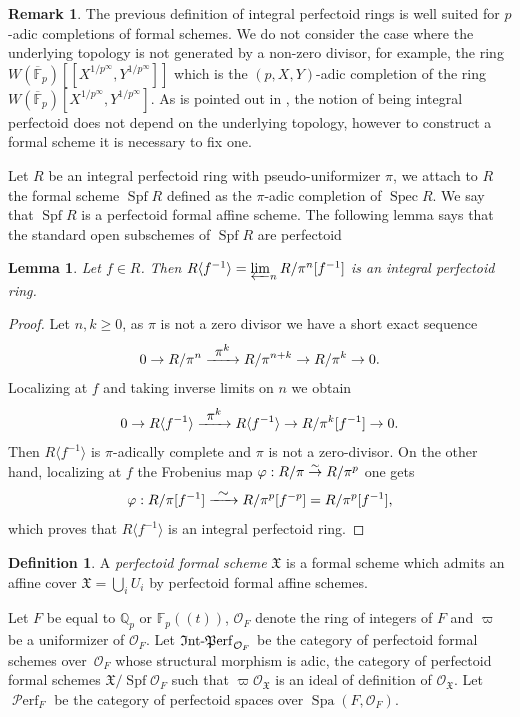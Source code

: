 \documentclass[JEP,XML,SOM,Unicode,published]{cedram}
\newcommand\To[1]{\mathchoice{\xrightarrow{\textstyle\kern4pt#1\kern3pt}}{\stackrel{#1}{\to}}{}{}}
\newcommand{\lcr}{[\![}
\newcommand{\rcr}{]\!]}
\newcommand{\lpr}{(\!(}
\newcommand{\rpr}{)\!)}
\numberwithin{equation}{section}
\newtheorem{lem}[prop]{Lemma}
\theoremstyle{definition}
\newtheorem{definition}[prop]{Definition}
\newtheorem{remark}[prop]{Remark}
\newcommand{\bb}[1]{\mathbb{#1}}
\newcommand{\n}[1]{\mathcal{#1}}
\newcommand{\f}[1]{\mathfrak{#1}}
\newcommand{\s}[1]{\mathscr{#1}}
\DeclareMathOperator{\Spf}{Spf}
\DeclareMathOperator{\Spec}{Spec}
\DeclareMathOperator{\Spa}{Spa}
\DeclareMathOperator{\Intperf}{\f{I}nt\textup{-}\f{P}erf}
\DeclareMathOperator{\Perf}{\s{P}erf}
\begin{document}
\begin{remark}
The previous definition of integral perfectoid rings is well suited for $p$-adic completions of formal schemes. We do not consider the case where the underlying topology is not generated by a non-zero divisor, for example, the ring $W(\overline{\bb{F}}_p)\lcr X^{1/p^\infty}, Y^{1/p^{\infty}}\rcr$ which is the $(p,X,Y)$-adic completion of the ring $W(\overline{\bb{F}}_p)[X^{1/p^{\infty}}, Y^{1/p^{\infty}}]$. As is pointed out in \cite[Rem.\,3.8]{MR3905467}, the notion of being integral perfectoid does not depend on the underlying topology, however to construct a formal scheme it is necessary to fix one.
\end{remark}

Let $R$ be an integral perfectoid ring with pseudo-uniformizer $\pi$, we attach to $R$ the formal scheme $\Spf R$ defined as the $\pi$-adic completion of $\Spec R$. We say that $\Spf R$ is a perfectoid formal affine scheme. The following lemma says that the standard open subschemes of $\Spf R$ are perfectoid

\begin{lem}
\label{lemLocalizationperf}
Let $f\in R$. Then $R\langle f^{-1} \rangle= \varprojlim_n R/\pi^n [f^{-1}]$ is an integral perfectoid ring.
\end{lem}

\begin{proof}
Let $n,k\geq 0$, as $\pi$ is not a zero divisor we have a short exact sequence
\[
0\to R/\pi^n \To{\pi^k} R/\pi^{n+k}\to R/\pi^k \to 0.
\]
Localizing at $f$ and taking inverse limits on $n$ we obtain
\[
0\to R\langle f^{-1}\rangle\To{\pi^k} R\langle f^{-1} \rangle\to R/\pi^{k} [f^{-1}]\to 0.
\]
Then $R\langle f^{-1} \rangle$ is $\pi$-adically complete and $\pi$ is not a zero-divisor. On the other hand, localizing at $f$ the Frobenius map
$\varphi: R/\pi \To{\sim} R/\pi^p$ one gets
\[
\varphi: R/\pi[f^{-1}]\To{\sim} R/\pi^{p}[f^{-p}]= R/\pi^p [f^{-1}],
\]
which proves that $R\langle f^{-1}\rangle$ is an integral perfectoid ring.
\end{proof}

\begin{definition}
A \textit{perfectoid formal scheme} $\f{X}$ is a formal scheme which admits an affine cover $\f{X}=\bigcup_i U_i$ by perfectoid formal affine schemes.
\end{definition}

Let $F$ be equal to $\bb{Q}_p$ or $\bb{F}_p\lpr t\rpr$, $\n{O}_F$ denote the ring of integers of $F$ and $\varpi$ be a uniformizer of $\n{O}_F$. Let $\Intperf_{\n{O}_F}$ be the category of perfectoid formal schemes over~$\n{O}_F$ whose structural morphism is adic, \ie the category of perfectoid formal schemes $\f{X}/\Spf \n{O}_F$ such that $\varpi \s{O}_{\f{X}}$ is an ideal of definition of $\s{O}_{\f{X}}$. Let $\Perf_F$ be the category of perfectoid spaces over $\Spa(F,\n{O}_F)$.
\end{document}
